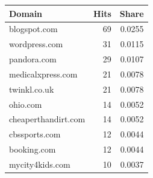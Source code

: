 \begin{tabular}{lrr}
\toprule
Domain & Hits & Share \\
\midrule
blogspot.com & 69 & 0.0255 \\
wordpress.com & 31 & 0.0115 \\
pandora.com & 29 & 0.0107 \\
medicalxpress.com & 21 & 0.0078 \\
twinkl.co.uk & 21 & 0.0078 \\
ohio.com & 14 & 0.0052 \\
cheaperthandirt.com & 14 & 0.0052 \\
cbssports.com & 12 & 0.0044 \\
booking.com & 12 & 0.0044 \\
mycity4kids.com & 10 & 0.0037 \\
\bottomrule
\end{tabular}
